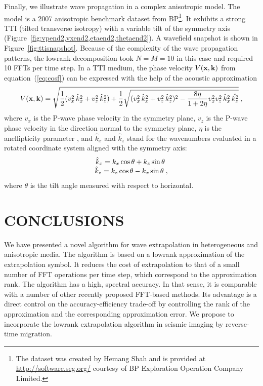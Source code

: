 Finally, we illustrate wave propagation in a complex anisotropic
model. The model is a 2007 anisotropic benchmark dataset from
BP\footnote{The dataset was created by Hemang Shah and is
    provided at \url{http://software.seg.org/} courtesy of BP Exploration Operation Company
    Limited.}. It exhibits a strong TTI (tilted transverse isotropy)
with a variable tilt of the symmetry axis
(Figure~\ref{fig:vpend2,vxend2,etaend2,thetaend2}).  A wavefield
snapshot is shown in Figure~\ref{fig:ttisnapshot}. Because of the
complexity of the wave propagation patterns, the lowrank decomposition
took $N=M=10$ in this case and required 10 FFTs per time step. In a
TTI medium, the phase velocity $V(\mathbf{x},\mathbf{k})$ from
equation~(\ref{eq:cosf}) can be expressed with the help of the
acoustic approximation
\cite[]{GEO63-02-06230631,GEO65-04-12391250,GPR52-03-02470259}
\begin{equation}
\label{eq:tti}
V(\mathbf{x},\mathbf{k}) =
\sqrt{\frac{1}{2}(v_x^2\,\hat{k}_x^2+v_z^2\,\hat{k}_z^2)+\frac{1}{2}\sqrt{(v_x^2\,\hat{k}_x^2+v_z^2\,\hat{k}_z^2)^2-\frac{8\eta}{1+2\eta}v_x^2v_z^2\,\hat{k}_x^2\,\hat{k_z^2}}}\;,
\end{equation}
where $v_x$ is the P-wave phase velocity in the symmetry plane, $v_z$
is the P-wave phase velocity in the direction normal to the symmetry
plane, $\eta$ is the anellipticity parameter
\cite[]{GEO60-05-15501566}, and $\hat{k}_x$ and $\hat{k}_z$ stand for
the wavenumbers evaluated in a rotated coordinate system aligned with
the symmetry axis:
\begin{equation}
\label{eq:wavenumber}
\begin{array}{*{20}c}
\hat{k}_x=k_x\cos{\theta}+k_z\sin{\theta}\;\\ 
\hat{k}_z=k_z\cos{\theta}-k_x\sin{\theta}\;,\\ 
 \end{array}
\end{equation}
where $\theta$ is the tilt angle measured with respect to horizontal.

\section{CONCLUSIONS}

We have presented a novel algorithm for wave extrapolation in
heterogeneous and anisotropic media. The algorithm is based on a
lowrank approximation of the extrapolation symbol. It reduces the cost
of extrapolation to that of a small number of FFT operations per time
step, which correspond to the approximation rank. The algorithm
has a high, spectral accuracy. In that sense, it is comparable with a
number of other recently proposed FFT-based methods. Its advantage is
a direct control on the accuracy-efficiency trade-off by controlling
the rank of the approximation and the corresponding approximation
error. We propose to incorporate the lowrank extrapolation algorithm
in seismic imaging by reverse-time migration. 


